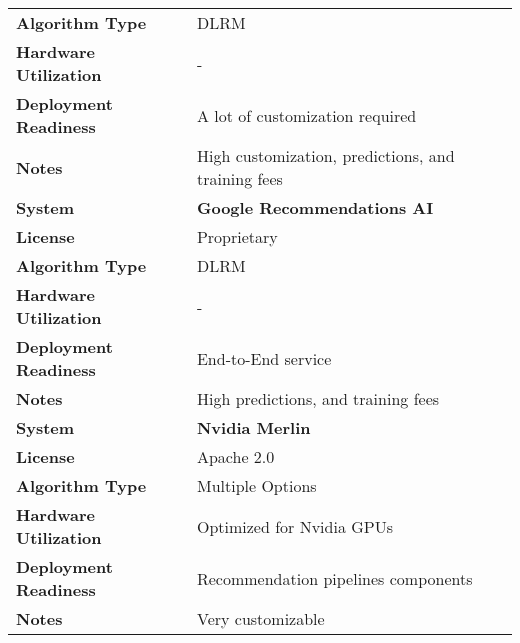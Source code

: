 \begin{table}[h]
\begin{tabular}{|l|l|}
        \cline{2-2}
        \textbf{Algorithm Type} & DLRM \\
        \cline{2-2}
        \textbf{Hardware Utilization} & - \\
        \cline{2-2}
        \textbf{Deployment Readiness} & A lot of customization required  \\
        \cline{2-2}
        \textbf{Notes} & High customization, predictions, and training fees \\
        \hline
        \hline
        \textbf{System} & \textbf{Google Recommendations AI} \\
        \cline{2-2}
        \textbf{License} & Proprietary \\
        \cline{2-2}
        \textbf{Algorithm Type} & DLRM \\
        \cline{2-2}
        \textbf{Hardware Utilization} & - \\
        \cline{2-2}
        \textbf{Deployment Readiness} & End-to-End service \\
        \cline{2-2}
        \textbf{Notes} & High predictions, and training fees \\
        \hline
        \hline
        \textbf{System} & \textbf{Nvidia Merlin} \\
        \cline{2-2}
        \textbf{License} & Apache 2.0 \\
        \cline{2-2}
        \textbf{Algorithm Type} & Multiple Options  \\
        \cline{2-2}
        \textbf{Hardware Utilization} & Optimized for Nvidia GPUs \\
        \cline{2-2}
        \textbf{Deployment Readiness} & Recommendation pipelines components \\
        \cline{2-2}
        \textbf{Notes} & Very customizable \\
        \hline
    \end{tabular}
\end{table}
        
